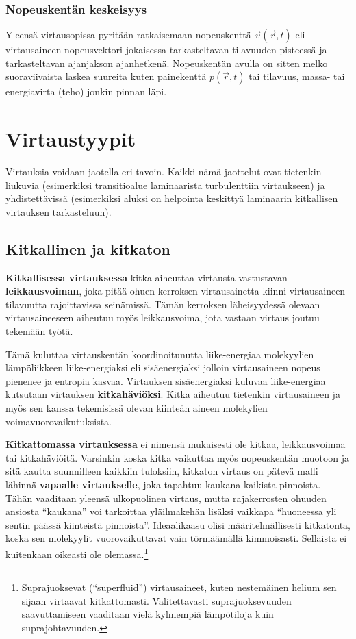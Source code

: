 \documentclass[12pt,a4paper,finnish]{book}
\begin{document}
\subsection{Nopeuskentän keskeisyys}
Yleensä virtausopissa pyritään ratkaisemaan nopeuskenttä \(\vec{v}(\vec{r}, t)\) eli virtausaineen 
nopeusvektori jokaisessa tarkasteltavan tilavuuden pisteessä ja tarkasteltavan ajanjakson 
ajanhetkenä. Nopeuskentän avulla on sitten melko suoraviivaista laskea suureita kuten painekenttä 
\(p(\vec{r}, t)\) tai tilavuus, massa- tai energiavirta (teho) jonkin pinnan läpi.

\chapter{Virtaustyypit}
Virtauksia voidaan jaotella eri tavoin. Kaikki nämä jaottelut ovat tietenkin liukuvia (esimerkiksi 
transitioalue laminaarista turbulenttiin virtaukseen) ja yhdistettävissä (esimerkiksi aluksi on 
helpointa keskittyä \underline{} \underline{laminaarin} 
\underline{} \underline{kitkallisen} virtauksen tarkasteluun).

\section{Kitkallinen ja kitkaton}
\textbf{Kitkallisessa virtauksessa} kitka aiheuttaa virtausta vastustavan \textbf{leikkausvoiman},
joka pitää ohuen kerroksen virtausainetta kiinni virtausaineen tilavuutta rajoittavissa seinämissä. 
Tämän kerroksen läheisyydessä olevaan virtausaineeseen aiheutuu myös leikkausvoima, jota vastaan 
virtaus joutuu tekemään työtä. 

Tämä kuluttaa virtauskentän koordinoitunutta liike-energiaa 
molekyylien lämpöliikkeen liike-energiaksi eli sisäenergiaksi jolloin virtausaineen nopeus 
pienenee ja entropia kasvaa. Virtauksen sisäenergiaksi kuluvaa liike-energiaa kutsutaan virtauksen 
\textbf{kitkahäviöksi}. Kitka aiheutuu tietenkin virtausaineen ja myös sen kanssa tekemisissä olevan 
kiinteän aineen molekylien voimavuorovaikutuksista.

\textbf{Kitkattomassa virtauksessa} ei nimensä mukaisesti ole kitkaa, leikkausvoimaa tai kitkahäviöitä. 
Varsinkin koska kitka vaikuttaa myös nopeuskentän muotoon ja sitä kautta suunnilleen kaikkiin tuloksiin, 
kitkaton virtaus on pätevä malli lähinnä \textbf{vapaalle virtaukselle}, joka tapahtuu kaukana 
kaikista pinnoista. Tähän vaaditaan yleensä ulkopuolinen virtaus, mutta rajakerrosten 
ohuuden ansiosta ``kaukana'' voi tarkoittaa yläilmakehän lisäksi vaikkapa ``huoneessa yli sentin 
päässä kiinteistä pinnoista''. Ideaalikaasu olisi määritelmällisesti kitkatonta,
koska sen molekyylit vuorovaikuttavat vain törmäämällä kimmoisasti. Sellaista ei kuitenkaan oikeasti 
ole olemassa.\footnote{Suprajuoksevat (``superfluid'') virtausaineet, kuten 
\href{http://www.youtube.com/watch?v=2Z6UJbwxBZI}{nestemäinen helium} sen sijaan virtaavat kitkattomasti. 
Valitettavasti suprajuoksevuuden saavuttamiseen vaaditaan vielä kylmempiä lämpötiloja kuin suprajohtavuuden.}
\end{document}
